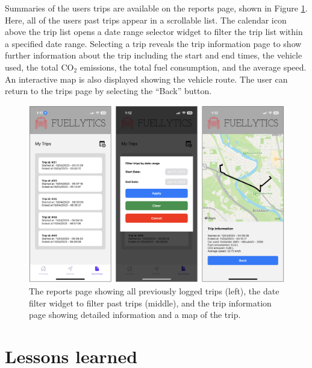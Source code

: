 \documentclass[11pt, oneside]{article}
\begin{document}
Summaries of the users trips are available on the reports page, shown in Figure \ref*{fig:reports}.  Here, all of the users past trips appear in a scrollable list. The calendar icon above the trip list opens a date range selector widget to filter the trip list within a specified date range. Selecting a trip reveals the trip information page to show further information about the trip including the start and end times, the vehicle used, the total CO$_2$ emissions, the total fuel consumption, and the average speed.  An interactive map is also displayed showing the vehicle route. The user can return to the trips page by selecting the ``Back'' button.
\begin{figure}[H]
\centerline{\includegraphics[width=16.5cm]{img/reports.png}}
\caption{\label{fig:reports} The reports page showing all previously logged trips (left), the date filter widget to filter past trips (middle), and the trip information page showing detailed information and a map of the trip.}
\end{figure}


\section{Lessons learned}
\end{document}
